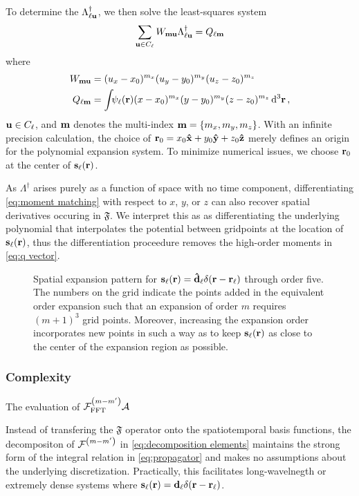 To determine the $\Lambda_{\ell \vb{u}}^\dagger$, we then solve the least-squares system
\begin{equation}
  \sum_{\vb{u} \in C_\ell} W_{\vb{m}\vb{u}}\Lambda_{\ell\vb{u}}^\dagger = Q_{\ell\vb{m}}
  \label{eq:expansion matrix system}
\end{equation}
where
\begin{subequations}
  \begin{align}
    W_{\vb{m}\vb{u}} &= (u_x - x_0)^{m_x} (u_y - y_0)^{m_y} (u_z - z_0)^{m_z} \label{eq:w matrix} \\
    Q_{\ell \vb{m}} &= \int_{} \psi_\ell(\vb{r}) (x - x_0)^{m_x} (y - y_0)^{m_y} (z - z_0)^{m_z} \dd[3]{\vb{r}} \label{eq:q vector},
  \end{align}
\end{subequations}
$\vb{u} \in C_\ell$, and $\vb{m}$ denotes the multi-index $\vb{m} = \qty{m_x, m_y, m_z}$.
With an infinite precision calculation, the choice of $\vb{r}_0 = x_0 \vu{x} + y_0 \vu{y} + z_0 \vu{z}$ merely defines an origin for the polynomial expansion system.
To minimize numerical issues, we choose $\vb{r}_0$ at the center of $\vb{s}_\ell(\vb{r})$.

As $\Lambda^\dagger$ arises purely as a function of space with no time component, differentiating \cref{eq:moment matching} with respect to $x$, $y$, or $z$ can also recover spatial derivatives occuring in $\mathfrak{F}$.
We interpret this as as differentiating the underlying polynomial that interpolates the potential between gridpoints at the location of $\vb{s}_\ell(\vb{r})$, thus the differentiation proceedure removes the high-order moments in \cref{eq:q vector}.

\begin{figure}
  \centering
  \caption{\label{fig:expansion pattern}Spatial expansion pattern for $\vb{s}_\ell(\vb{r}) = \vu{d}_\ell \delta(\vb{r} - \vb{r}_\ell)$ through order five.
    The numbers on the grid indicate the points added in the equivalent order expansion such that an expansion of order $m$ requires $(m + 1)^3$ grid points.
    Moreover, increasing the expansion order incorporates new points in such a way as to keep $\vb{s}_\ell(\vb{r})$ as close to the center of the expansion region as possible.
  }
\end{figure}

\subsubsection{Complexity}

The evaluation of $\mathcal{F}_\text{FFT}^\qty(m-m') \mathcal{A}$

Instead of transfering the $\mathfrak{F}$ operator onto the spatiotemporal basis functions, the decompositon of $\mathcal{F}^\qty(m-m')$ in \cref{eq:decomposition elements} maintains the strong form of the integral relation in \cref{eq:propagator} and makes no assumptions about the underlying discretization.
Practically, this facilitates long-wavelnegth or extremely dense systems where $\vb{s}_\ell(\vb{r}) = \vb{d}_\ell \delta(\vb{r}-\vb{r}_\ell)$.


